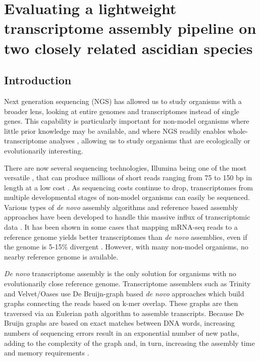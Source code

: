 \chapter{Evaluating a lightweight transcriptome assembly pipeline on two closely related ascidian species}

\section{Introduction}

Next generation sequencing (NGS) has allowed us to study organisms with a broader lens, looking at entire genomes and transcriptomes instead of single genes.  This capability is particularly important for non-model organisms where little prior knowledge may be available, and where NGS readily enables whole-transcriptome analyses \citep{wang_rna-seq:_2009}, allowing us to study organisms that are ecologically or evolutionarily interesting.

There are now several sequencing technologies, Illumina being one of the most versatile \citep{glenn_field_2011}, that can produce millions of short reads ranging from 75 to 150 bp in length at a low cost \citep{zhang_impact_2011}. As sequencing costs continue to drop, transcriptomes from multiple developmental stages of non-model organisms can easily be sequenced. Various types of \textit{de novo} assembly algorithms and reference based assembly approaches have been developed to handle this massive influx of transcriptomic data \citep{pop_genome_2009,vinson_assembly_2005,stapley_adaptation_2010}. It has been shown in some cases that mapping mRNA-seq reads to a reference genome yields better transcriptomes than \textit{de novo} assemblies, even if the genome is 5-15\% divergent \citep{vijay_challenges_2012}. However, with many non-model organisms, no nearby reference genome is available.

\textit{De novo} transcriptome assembly is the only solution for organisms with no evolutionarily close reference genome.  Transcriptome assemblers such as Trinity \citep{grabherr_full-length_2011} and Velvet/Oases \citep{zerbino_velvet:_2008,schulz_oases:_2012} use De Bruijn-graph based \textit{de novo} approaches which build graphs connecting the reads based on k-mer overlap. These graphs are then traversed via an Eulerian path algorithm to assemble transcripts. Because De Bruijn graphs are based on exact matches between DNA words, increasing numbers of sequencing errors result in an exponential number of new paths, adding to the complexity of the graph and, in turn, increasing the assembly time and memory requirements \citep{pop_genome_2009}.

